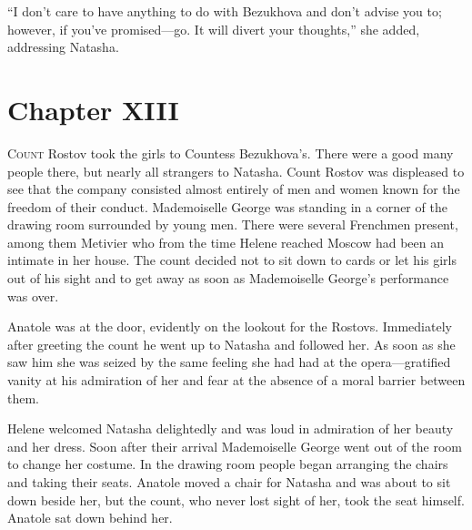 ``I don't care to have anything to do with Bezukhova and don't
advise you to; however, if you've promised---go. It will divert
your thoughts,'' she added, addressing Natasha.


\chapter*{Chapter XIII}
\ifaudio     
{} 
\fi

\lettrine[lines=2, loversize=0.3, lraise=0]{\initfamily C}{ount}
Rostov took the girls to Countess Bezukhova's. There were a
good many people there, but nearly all strangers to
Natasha. Count Rostov was displeased to see that the company
consisted almost entirely of men and women known for the freedom
of their conduct. Mademoiselle George was standing in a corner of
the drawing room surrounded by young men. There were several
Frenchmen present, among them Metivier who from the time Helene
reached Moscow had been an intimate in her house. The count
decided not to sit down to cards or let his girls out of his
sight and to get away as soon as Mademoiselle George's
performance was over.

Anatole was at the door, evidently on the lookout for the
Rostovs.  Immediately after greeting the count he went up to
Natasha and followed her. As soon as she saw him she was seized
by the same feeling she had had at the opera---gratified vanity
at his admiration of her and fear at the absence of a moral
barrier between them.

Helene welcomed Natasha delightedly and was loud in admiration of
her beauty and her dress. Soon after their arrival Mademoiselle
George went out of the room to change her costume. In the drawing
room people began arranging the chairs and taking their
seats. Anatole moved a chair for Natasha and was about to sit
down beside her, but the count, who never lost sight of her, took
the seat himself. Anatole sat down behind her.


